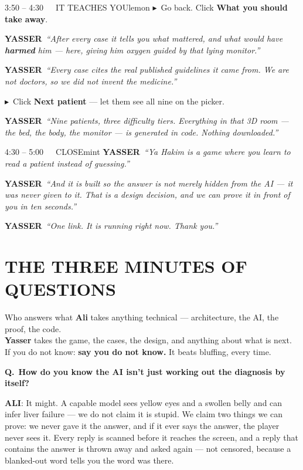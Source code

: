 \documentclass[11pt,a4paper]{article}
\newcommand{\Y}{\textcolor{mintdeep}{\textbf{YASSER}}}
\newcommand{\A}{\textcolor{peridp}{\textbf{ALI}}}
\newcommand{\say}[1]{\textit{``#1''}}
\newcommand{\act}[1]{\textcolor{inksoft}{\small$\blacktriangleright$~#1}}
\newcommand{\qa}[2]{%
  \par\smallskip\noindent\textbf{\textcolor{peridp}{Q.}}~\textbf{#1}\par
  \noindent\hspace{4.4mm}\begin{minipage}{0.95\linewidth}#2\end{minipage}\par\smallskip}
\begin{document}
\begin{beat}{3:50 -- 4:30\ \ \ IT TEACHES YOU}{lemon}
\act{Go back. Click \textbf{What you should take away}.}\par\smallskip
\Y\ \say{After every case it tells you what mattered, and what would have
\textbf{harmed} him --- here, giving him oxygen guided by that lying monitor.}\par\smallskip
\Y\ \say{Every case cites the real published guidelines it came from. We are not
doctors, so we did not invent the medicine.}\par\smallskip
\act{Click \textbf{Next patient} --- let them see all nine on the picker.}\par\smallskip
\Y\ \say{Nine patients, three difficulty tiers. Everything in that 3D room ---
the bed, the body, the monitor --- is generated in code. Nothing downloaded.}
\end{beat}

\begin{beat}{4:30 -- 5:00\ \ \ CLOSE}{mint}
\Y\ \say{Ya Hakim is a game where you learn to read a patient instead of guessing.}\par\smallskip
\Y\ \say{And it is built so the answer is not merely hidden from the AI ---
it was never given to it. That is a design decision, and we can prove it in
front of you in ten seconds.}\par\smallskip
\Y\ \say{One link. It is running right now. Thank you.}
\end{beat}

\newpage

\section*{THE THREE MINUTES OF QUESTIONS}

\begin{panel}[peri]{Who answers what}
\textbf{Ali} takes anything technical --- architecture, the AI, the proof, the code.\\
\textbf{Yasser} takes the game, the cases, the design, and anything about what is next.\\[1.5mm]
If you do not know: \textbf{say you do not know.} It beats bluffing, every time.
\end{panel}

\bigskip

\qa{How do you know the AI isn't just working out the diagnosis by itself?}{%
\A: It might. A capable model sees yellow eyes and a swollen belly and can infer
liver failure --- we do not claim it is stupid. We claim two things we can prove:
we never gave it the answer, and if it ever says the answer, the player never sees
it. Every reply is scanned before it reaches the screen, and a reply that contains
the answer is thrown away and asked again --- not censored, because a blanked-out
word tells you the word was there.}
\end{document}
